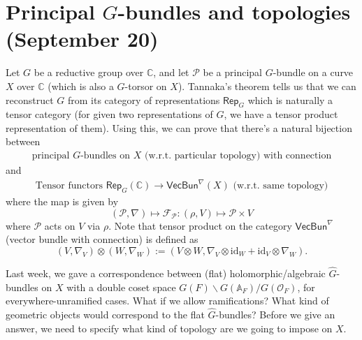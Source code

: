 \newpage
\section{Principal $G$-bundles and topologies (September 20)}

Let $G$ be a reductive group over $\mathbb{C}$, and let $\mathcal{P}$ be a principal
$G$-bundle on a curve $X$ over $\mathbb{C}$ (which is also a $G$-torsor on $X$).
Tannaka's theorem tells us that we can reconstruct $G$ from its category of representations $\mathsf{Rep}_{G}$
which is naturally a tensor category (for given two representations of $G$, we have a tensor product representation of them).
Using this, we can prove that there's a natural bijection between 
\begin{align*}
    \boxed{
        \text{principal $G$-bundles on $X$ (w.r.t. particular topology) with connection}
    }
\end{align*}
and
\begin{align*}
    \boxed{
        \text{Tensor functors $\mathsf{Rep}_{G}(\mathbb{C}) \to \mathsf{VecBun}^{\nabla}(X)$ (w.r.t. same topology)}
    }
\end{align*}
where the map is given by
$$
(\mathcal{P}, \nabla) \mapsto \mathcal{F}_{\mathcal{P}}: (\rho, V) \mapsto \mathcal{P} \times V
$$
where $\mathcal{P}$ acts on $V$ via $\rho$.
Note that tensor product on the category $\mathsf{VecBun}^{\nabla}$ (vector bundle with connection) is defined as
$$
(V, \nabla_V) \otimes (W, \nabla_W) := (V \otimes W, \nabla_V \otimes \mathrm{id}_W + \mathrm{id}_V \otimes \nabla_W).
$$

Last week, we gave a correspondence between (flat) holomorphic/algebraic $\hat{G}$-bundles on $X$ with 
a double coset space $G(F)\backslash G(\mathbb{A}_F) / G(\mathcal{O}_F)$, for everywhere-unramified cases.
What if we allow ramifications? What kind of geometric objects would correspond to the flat $\hat{G}$-bundles?
Before we give an answer, we need to specify what kind of topology are we going to impose on $X$.

